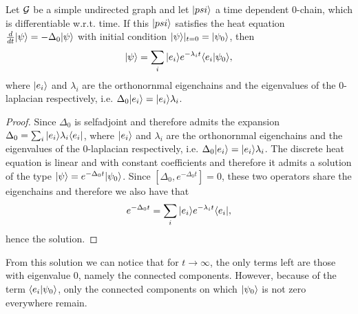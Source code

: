 \documentclass[../2.tex]{subfiles}
\begin{document}
    \begin{prop}
        {\color{blue}Let $\mathcal{G}$ be a simple undirected graph and let $| psi \rangle$ a time dependent $0$-chain, which is differentiable w.r.t. time.
        If this $| psi \rangle$ satisfies the heat equation $\frac{d}{dt}| \psi \rangle = -\Delta_0 | \psi \rangle$ with initial condition $| \psi \rangle|_{t = 0} = | \psi_0 \rangle$, then
        \[ | \psi \rangle = \sum_i| e_i \rangle e^{-\lambda_i t}\langle e_i | \psi_0 \rangle, \]
        where $| e_i \rangle$ and $\lambda_i$ are the orthonornmal eigenchains and the eigenvalues of the $0$-laplacian respectively,
        i.e. $\Delta_0| e_i \rangle =| e_i \rangle\lambda_i$.}
    \end{prop}
    \begin{proof}
        Since $\Delta_0$ is selfadjoint and therefore admits the expansion $\Delta_0 = \sum_i | e_i \rangle\lambda_i\langle e_i |$,
        where $| e_i \rangle$ and $\lambda_i$ are the orthonornmal eigenchains and the eigenvalues of the $0$-laplacian respectively,
        i.e. $\Delta_0| e_i \rangle =| e_i \rangle\lambda_i$. The discrete heat equation is linear and with constant coefficients and therefore
        it admits a solution of the type $| \psi \rangle = e^{-\Delta_0 t}| \psi_0 \rangle$.
        Since $[\Delta_0, e^{-\Delta_0 t}] = 0$, these two operators share the eigenchains and therefore we also have that
        \[ e^{-\Delta_0 t} = \sum_i | e_i \rangle e^{-\lambda_i t} \langle e_i |,\]
        hence the solution. \qedhere
    \end{proof}

    From this solution we can notice that for $t \to \infty$, the only terms left are those with eigenvalue $0$, namely the connected components.
    However, because of the term $\langle e_i | \psi_0 \rangle$, only the connected components on which $| \psi_0 \rangle$ is not zero everywhere remain.
\end{document}
